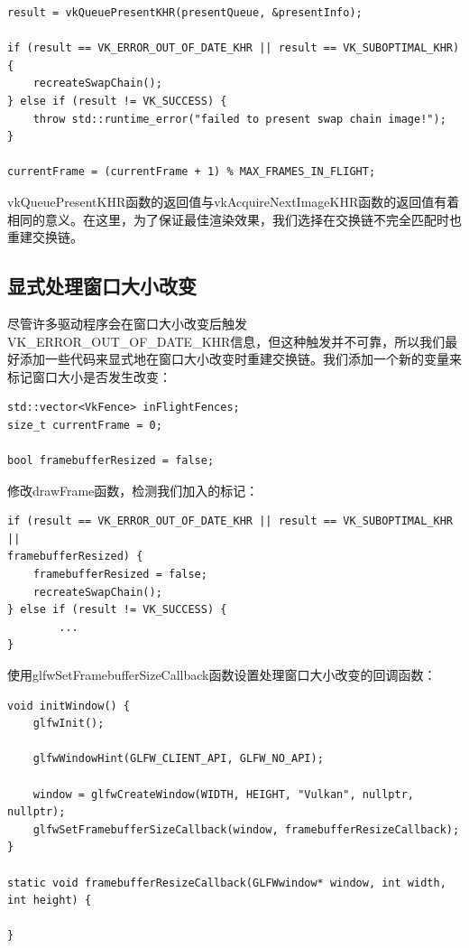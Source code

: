\documentclass{ctexart}
\begin{document}
\begin{lstlisting}[language={[ANSI]C}]
result = vkQueuePresentKHR(presentQueue, &presentInfo);

if (result == VK_ERROR_OUT_OF_DATE_KHR || result == VK_SUBOPTIMAL_KHR) {
	recreateSwapChain();
} else if (result != VK_SUCCESS) {
	throw std::runtime_error("failed to present swap chain image!");
}

currentFrame = (currentFrame + 1) % MAX_FRAMES_IN_FLIGHT;
\end{lstlisting}

vkQueuePresentKHR函数的返回值与vkAcquireNextImageKHR函数的返回值有着相同的意义。在这里，为了保证最佳渲染效果，我们选择在交换链不完全匹配时也重建交换链。

\subsection{显式处理窗口大小改变}

尽管许多驱动程序会在窗口大小改变后触发VK\_ERROR\_OUT\_OF\_DATE\_KHR信息，但这种触发并不可靠，所以我们最好添加一些代码来显式地在窗口大小改变时重建交换链。我们添加一个新的变量来标记窗口大小是否发生改变：

\begin{lstlisting}[language={[ANSI]C}]
std::vector<VkFence> inFlightFences;
size_t currentFrame = 0;

bool framebufferResized = false;
\end{lstlisting}

修改drawFrame函数，检测我们加入的标记：

\begin{lstlisting}[language={[ANSI]C}]
if (result == VK_ERROR_OUT_OF_DATE_KHR || result == VK_SUBOPTIMAL_KHR || 
framebufferResized) {
	framebufferResized = false;
	recreateSwapChain();
} else if (result != VK_SUCCESS) {
		...
}
\end{lstlisting}

使用glfwSetFramebufferSizeCallback函数设置处理窗口大小改变的回调函数：

\begin{lstlisting}[language={[ANSI]C}]
void initWindow() {
	glfwInit();

	glfwWindowHint(GLFW_CLIENT_API, GLFW_NO_API);

	window = glfwCreateWindow(WIDTH, HEIGHT, "Vulkan", nullptr, nullptr);
	glfwSetFramebufferSizeCallback(window, framebufferResizeCallback);
}

static void framebufferResizeCallback(GLFWwindow* window, int width, int height) {

}
\end{lstlisting}
\end{document}
